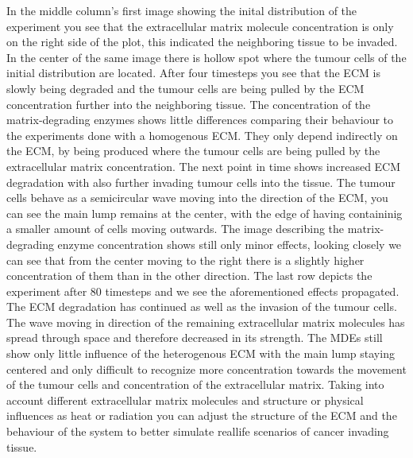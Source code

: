 In the middle column's first image showing the inital distribution of the experiment you see that the extracellular matrix molecule concentration is only on the right side of the plot, this indicated the neighboring tissue to be invaded. In the center of the same image there is hollow spot where the tumour cells of the initial distribution are located. \newline 
After four timesteps you see that the ECM is slowly being degraded and the tumour cells are being pulled by the ECM concentration further into the neighboring tissue. The concentration of the matrix-degrading enzymes shows little differences comparing their behaviour to the experiments done with a homogenous ECM. They only depend indirectly on the ECM, by being produced where the tumour cells are being pulled by the extracellular matrix concentration. \newline
The next point in time shows increased ECM degradation with also further invading tumour cells into the tissue. The tumour cells behave as a semicircular wave moving into the direction of the ECM, you can see the main lump remains at the center, with the edge of having containinig a smaller amount of cells moving outwards. The image describing the matrix-degrading enzyme concentration shows still only minor effects, looking closely we can see that from the center moving to the right there is a slightly higher concentration of them than in the other direction.\newline
The last row depicts the experiment after $80$ timesteps and we see the aforementioned effects propagated. The ECM degradation has continued as well as the invasion of the tumour cells. The wave moving in direction of the remaining extracellular matrix molecules has spread through space and therefore decreased in its strength. The MDEs still show only little influence of the heterogenous ECM with the main lump staying centered and only difficult to recognize more concentration towards the movement of the tumour cells and concentration of the extracellular matrix.\newline 
Taking into account different extracellular matrix molecules and structure or physical influences as heat or radiation you can adjust the structure of the ECM and the behaviour of the system to better simulate reallife scenarios of cancer invading tissue.